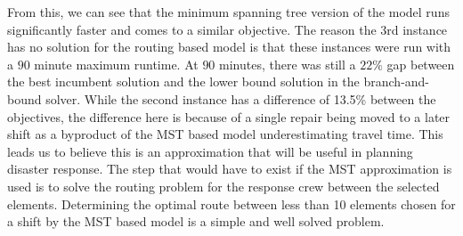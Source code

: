From this, we can see that the minimum spanning tree version of the model runs significantly faster and comes to a similar objective. The reason the 3rd instance has no solution for the routing based model is that these instances were run with a $90$ minute maximum runtime. At $90$ minutes, there was still a $22\%$ gap between the best incumbent solution and the lower bound solution in the branch-and-bound solver. While the second instance has a difference of 13.5\% between the objectives, the difference here is because of a single repair being moved to a later shift as a byproduct of the MST based model underestimating travel time. This leads us to believe this is an approximation that will be useful in planning disaster response. The step that would have to exist if the MST approximation is used is to solve the routing problem for the response crew between the selected elements. Determining the optimal route between less than 10 elements chosen for a shift by the MST based model is a simple and well solved problem.

